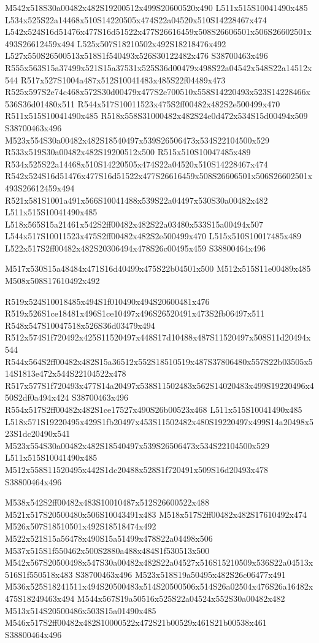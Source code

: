 \documentclass{article}
\begin{document}
\begin{multicols}{2}
M542x518S30a00482x482S19200512x499S20600520x490 L511x515S10041490x485 L534x525S22a14468x510S14220505x474S22a04520x510S14228467x474 L542x524S16d51476x477S16d51522x477S26616459x508S26606501x506S26602501x493S26612459x494 L525x507S18210502x492S18218476x492 L527x550S26500513x518S1f540493x526S30122482x476 S38700463x496 R555x563S15a37499x521S15a37531x525S36d00479x498S22a04542x548S22a14512x544 R517x527S1004a487x512S10041483x485S22f04489x473 R525x597S2e74c468x572S30d00479x477S2e700510x558S14220493x523S14228466x536S36d01480x511 R544x517S10011523x475S2ff00482x482S2e500499x470 R511x515S10041490x485 R518x558S31000482x482S24e0d472x534S15d00494x509 S38700463x496 M523x554S30a00482x482S18540497x539S26506473x534S22104500x529 R533x519S30a00482x482S19200512x500 R515x510S10047485x489 R534x525S22a14468x510S14220505x474S22a04520x510S14228467x474 R542x524S16d51476x477S16d51522x477S26616459x508S26606501x506S26602501x493S26612459x494 R521x581S1001a491x566S10041488x539S22a04497x530S30a00482x482 L511x515S10041490x485 L518x565S15a21461x542S2ff00482x482S22a03480x533S15a00494x507 L544x517S10011523x475S2ff00482x482S2e500499x470 L515x510S10017485x489 L522x517S2ff00482x482S20306494x478S26c00495x459 S38800464x496

\begin{center}
M517x530S15a48484x471S16d40499x475S22b04501x500 M512x515S11e00489x485 M508x508S17610492x492 
\end{center}


R519x524S10018485x494S1f010490x494S20600481x476 R519x526S1ce18481x496S1ce10497x496S26520491x473S2fb06497x511 R548x547S10047518x526S36d03479x494 R512x574S1f720492x425S11520497x448S17d10488x487S11520497x508S11d20494x544 R544x564S2ff00482x482S15a36512x552S18510519x487S37806480x557S22b03505x514S1813e472x544S22104522x478 R517x577S1f720493x477S14a20497x538S11502483x562S14020483x499S19220496x450S2df0a494x424 S38700463x496 R554x517S2ff00482x482S1ce17527x490S26b00523x468 L511x515S10041490x485 L518x571S19220495x429S1fb20497x453S11502482x480S19220497x499S14a20498x523S1dc20490x541 M523x554S30a00482x482S18540497x539S26506473x534S22104500x529 L511x515S10041490x485 M512x558S11520495x442S1dc20488x528S1f720491x509S16d20493x478 S38800464x496

M538x542S2ff00482x483S10010487x512S26600522x488 M521x517S20500480x506S10043491x483 M518x517S2ff00482x482S17610492x474 M526x507S18510501x492S18518474x492 M522x521S15a56478x490S15a51499x478S22a04498x506 M537x515S1f550462x500S2880a488x484S1f530513x500 M542x567S20500498x547S30a00482x482S22a04527x516S15210509x536S22a04513x516S1f550518x483 S38700463x496 M523x518S19a50495x482S26c06477x491 M536x525S18241511x494S20500483x514S20500506x514S26a02504x476S26a16482x475S18249463x494 M544x567S19a50516x525S22a04524x552S30a00482x482 M513x514S20500486x503S15a01490x485 M546x517S2ff00482x482S10000522x472S21b00529x461S21b00538x461 S38800464x496


\end{multicols}
\end{document}
